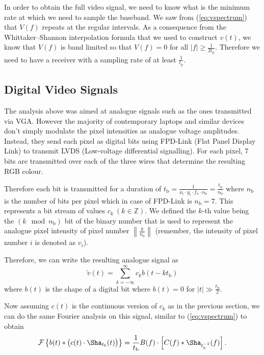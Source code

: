 \documentclass[a4paper,12pt,twoside,openright]{report}
\begin{document}
In order to obtain the full video signal, we need to know what is the minimum rate at which we need to sample the baseband. We saw from (\ref{eq:vspectrum}) that $V(f)$ repeats at the regular intervals. As a consequence from the Whittaker--Shannon interpolation formula that we used to construct $v(t)$, we know that $V(f)$ is band limited so that $V(f) = 0$ for all $|f| \geq \frac{1}{2 t_\text{p}}$. Therefore we need to have a receiver with a sampling rate of at least $\frac{1}{t_\text{p}}$.

\subsection{Digital Video Signals}

The analysis above was aimed at analogue signals such as the ones transmitted via VGA. However the majority of contemporary laptops and similar devices don't simply modulate the pixel intensities as analogue voltage amplitudes. Instead, they send each pixel as digital bits using FPD-Link (Flat Panel Display Link) to transmit LVDS (Low-voltage differential signalling). For each pixel, 7 bits are transmitted over each of the three wires that determine the resulting RGB colour.

Therefore each bit is transmitted for a duration of $t_\text{b}=\frac{1}{x_\text{t} \cdot y_\text{t} \cdot f_\text{v} \cdot n_\text{b}}=\frac{t_\text{p}}{n_\text{b}}$ where $n_\text{b}$ is the number of bits per pixel which in case of FPD-Link is $n_\text{b} = 7$. This represents a bit stream of values $c_{k}\ (k \in \mathbb{Z})$. We defined the $k$-th value being the $(k \mod n_\text{b})$ bit of the binary number that is used to represent the analogue pixel intensity of pixel number $\left\| \frac{k}{n_\text{b}} \right\|$ (remember, the intensity of pixel number $i$ is denoted as $v_{i}$).

Therefore, we can write the resulting analogue signal as
$$\tilde{v}(t) = \sum\limits_{k=-\infty}^{\infty} c_{k} b(t-k t_\text{b})$$
where $b(t)$ is the shape of a digital bit where $b(t)=0$ for $|t| \gg \frac{t_\text{b}}{2}$.

Now assuming $c(t)$ is the continuous version of $c_{k}$ as in the previous section, we can do the same Fourier analysis on this signal, similar to (\ref{eq:vspectrum}) to obtain
\begin{equation} 
\mathcal{F} \left\{ b(t) \ast \big( c(t) \cdot \Sha_{t_{b}} (t) \big) \right\} = \\
\frac{1}{t_\text{b}} B(f) \cdot  \left[ C(f) \ast 
\Sha_{t_{b}^{-1}}(f) 
\right] .
\end{equation}
\end{document}
